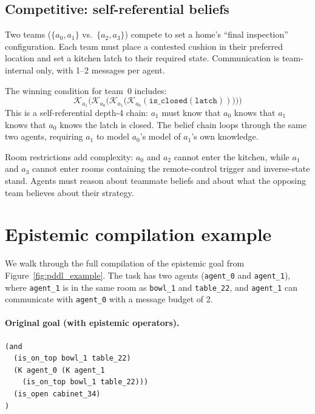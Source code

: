 \documentclass{article} %
\newcommand{\K}{\mathcal{K}}
\begin{document}
\subsection{Competitive: self-referential beliefs}
\label{app:example_comp}

Two teams ($\{a_0, a_1\}$ vs.\ $\{a_2, a_3\}$) compete to set a home's ``final inspection'' configuration. Each team must place a contested cushion in their preferred location and set a kitchen latch to their required state. Communication is team-internal only, with 1--2 messages per agent.

The winning condition for team~0 includes:
%
\begin{equation}
  \K_{a_1}\bigl(\K_{a_0}\bigl(\K_{a_1}\bigl(\K_{a_0}(\texttt{is\_closed}(\texttt{latch}))\bigr)\bigr)\bigr)
  \label{eq:example_selfref}
\end{equation}
%
This is a self-referential depth-4 chain: $a_1$ must know that $a_0$ knows that $a_1$ knows that $a_0$ knows the latch is closed. The belief chain loops through the same two agents, requiring $a_1$ to model $a_0$'s model of $a_1$'s own knowledge.

Room restrictions add complexity: $a_0$ and $a_2$ cannot enter the kitchen, while $a_1$ and $a_3$ cannot enter rooms containing the remote-control trigger and inverse-state stand. Agents must reason about teammate beliefs and about what the opposing team believes about their strategy.

\section{Epistemic compilation example}
\label{app:compilation}

We walk through the full compilation of the epistemic goal from Figure~\ref{fig:pddl_example}. The task has two agents (\texttt{agent\_0} and \texttt{agent\_1}), where \texttt{agent\_1} is in the same room as \texttt{bowl\_1} and \texttt{table\_22}, and \texttt{agent\_1} can communicate with \texttt{agent\_0} with a message budget of 2.

\paragraph{Original goal (with epistemic operators).}

\begin{lstlisting}
(and
  (is_on_top bowl_1 table_22)
  (K agent_0 (K agent_1
    (is_on_top bowl_1 table_22)))
  (is_open cabinet_34)
)
\end{lstlisting}
\end{document}

